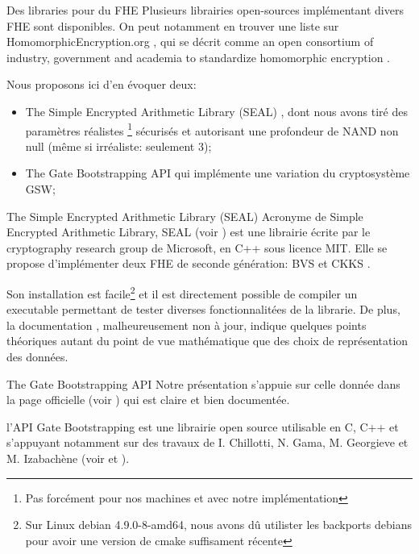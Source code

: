 
\begin{section}{Des libraries pour du FHE}
Plusieurs librairies open-sources implémentant divers FHE sont disponibles. 
On peut notamment en trouver une liste sur HomomorphicEncryption.org \cite{homencrypt.org}, 
qui se décrit comme \og an open consortium of industry, government and academia to 
standardize homomorphic encryption \fg.

Nous proposons ici d'en évoquer deux:
\begin{itemize}
\item The Simple Encrypted Arithmetic Library (SEAL) \cite{seal}, dont nous avons tiré des paramètres  
\og réalistes \fg\footnote{Pas forcément pour nos machines et avec notre implémentation}
sécurisés et autorisant une profondeur de NAND non null (même si irréaliste: seulement 3);
\item The Gate Bootstrapping API \cite{TFHE} qui implémente une variation du cryptosystème GSW;
\end{itemize}

\begin{subsection}{The Simple Encrypted Arithmetic Library (SEAL)}
Acronyme de Simple Encrypted Arithmetic Library, SEAL (voir \cite{seal}) 
est une librairie écrite par le \og cryptography research group \fg de Microsoft, en C++ sous 
licence MIT. Elle se propose d'implémenter deux FHE de seconde génération: 
BVS \cite{EPRINT:FanVer12} et CKKS \cite{AC:CKKS17}.

Son installation est facile\footnote{Sur Linux debian 4.9.0-8-amd64, nous avons dû
utilister les backports debians pour avoir une version de cmake suffisament récente}
et il est directement possible de compiler un executable permettant de tester 
diverses fonctionnalitées de la librarie. De plus, la documentation
\cite{seal_manual_231},
malheureusement non à jour, indique quelques points théoriques autant du point 
de vue mathématique que des choix de représentation des données.
\end{subsection}

\begin{subsection}{The Gate Bootstrapping API}
Notre présentation s'appuie sur celle donnée dans la page officielle (voir \cite{TFHE})
 qui est claire et bien documentée.

l'API Gate Bootstrapping est une librairie open source utilisable en C, C++ et 
s'appuyant notamment sur des travaux de I. Chillotti, N. Gama, M. Georgieve et M. Izabachène 
(voir \cite{cryptoeprint:2017:430} et  \cite{cryptoeprint:2016:870}). 


\end{subsection}
\end{section}
